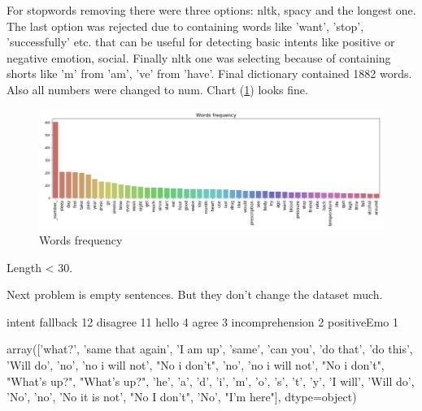 \documentclass[11pt]{article}
\begin{document}
For stopwords removing there were three options: nltk, spacy and the longest one. The last option was rejected due to containing words like 'want', 'stop', 'successfully' etc. that can be useful for detecting basic intents like positive or negative emotion, social. Finally nltk one was selecting because of containing shorts like 'm' from 'am', 've' from 'have'. Final dictionary contained 1882 words. Also all numbers were changed to num. Chart (\ref{words_freq}) looks fine.

 \begin{figure}[h]
 	\centering
 	\includegraphics[scale=0.4]{report2.png}
	\caption{Words frequency}
 \label{words_freq}
 \end{figure}

Length < 30.


Next problem is empty sentences. But they don't change the dataset much.

intent
fallback           12
disagree           11
hello               4
agree               3
incomprehension     2
positiveEmo         1

array(['what?', 'same that again', 'I am up', 'same', 'can you',
       'do that', 'do this', 'Will do', 'no', 'no i will not',
       "No i don't", 'no', 'no i will not', "No i don't", "What's up?",
       "What's up?", 'he', 'a', 'd', 'i', 'm', 'o', 's', 't', 'y',
       'I will', 'Will do', 'No', 'no', 'No it is not', "No I don't",
       'No', "I'm here"], dtype=object)
\end{document}
